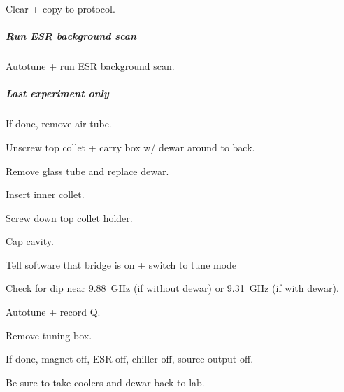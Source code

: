 Clear + copy to protocol.

\subparagraph{Run ESR background scan}
Autotune + run ESR background scan.

\subparagraph{Last experiment only}
If done, remove air tube.

Unscrew top collet + carry box w/ dewar around to back.

Remove glass tube and replace dewar.

Insert inner collet.

Screw down top collet holder.

Cap cavity.

Tell software that bridge is on + switch to tune mode

Check for dip near 9.88~GHz (if without dewar) or 9.31~GHz (if with dewar).

Autotune + record Q.

Remove tuning box.

If done, magnet off, ESR off, chiller off, source output off.

Be sure to take coolers and dewar back to lab.

\timeblockend

